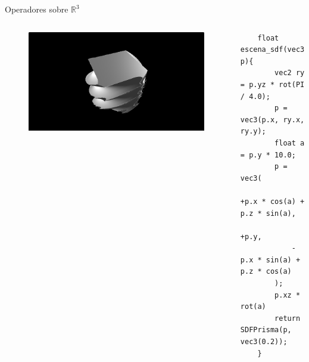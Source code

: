 \begin{frame}[fragile]{Operadores sobre \(\mathbb{R}^3\)}
\begin{columns}[c, onlytextwidth]
    \end{columns}
    
    \begin{columns}[c, onlytextwidth]
        \column{1.5in}
            \begin{figure}[H]
              \centering
              \includegraphics[width=1.0\textwidth]{imagenes/sdf/3d/sdf_twist.png}
            \end{figure}
        
        \column{\dimexpr\paperwidth-10pt}
            \begin{lstlisting}
    float escena_sdf(vec3 p){
        vec2 ry = p.yz * rot(PI / 4.0);
        p = vec3(p.x, ry.x, ry.y);
        float a = p.y * 10.0;
        p = vec3(
            +p.x * cos(a) + p.z * sin(a),
            +p.y,
            -p.x * sin(a) + p.z * cos(a)
        );
        p.xz * rot(a)
        return SDFPrisma(p, vec3(0.2));
    }
            \end{lstlisting}
        
    \end{columns}

\end{frame}